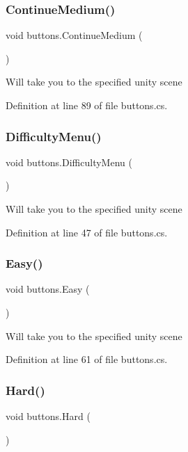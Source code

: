\subsubsection{\texorpdfstring{ContinueMedium()}{ContinueMedium()}}
{\footnotesize\ttfamily void buttons.\+Continue\+Medium (\begin{DoxyParamCaption}{ }\end{DoxyParamCaption})}

Will take you to the specified unity scene 

Definition at line 89 of file buttons.\+cs.

\mbox{\label{classbuttons_a9b4a7efe4c0f70242e545fa98fc077be}} 
\subsubsection{\texorpdfstring{DifficultyMenu()}{DifficultyMenu()}}
{\footnotesize\ttfamily void buttons.\+Difficulty\+Menu (\begin{DoxyParamCaption}{ }\end{DoxyParamCaption})}

Will take you to the specified unity scene 

Definition at line 47 of file buttons.\+cs.

\mbox{\label{classbuttons_ae997ca91888f5e46fb6f642135c5c6d2}} 
\subsubsection{\texorpdfstring{Easy()}{Easy()}}
{\footnotesize\ttfamily void buttons.\+Easy (\begin{DoxyParamCaption}{ }\end{DoxyParamCaption})}

Will take you to the specified unity scene 

Definition at line 61 of file buttons.\+cs.

\mbox{\label{classbuttons_acb209af32e987c4c20e09d8869553eda}} 
\subsubsection{\texorpdfstring{Hard()}{Hard()}}
{\footnotesize\ttfamily void buttons.\+Hard (\begin{DoxyParamCaption}{ }\end{DoxyParamCaption})}

